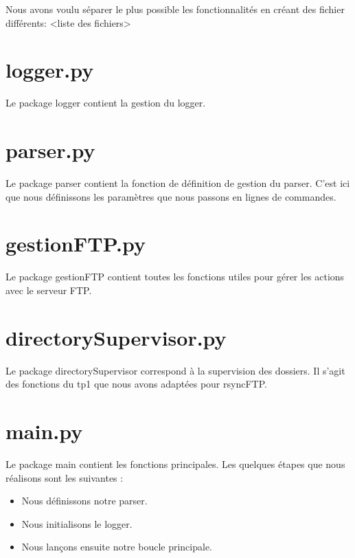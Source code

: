 Nous avons voulu séparer le plus possible les fonctionnalités en créant des fichier différents: <liste des fichiers>

\section{logger.py}	

Le package logger contient la gestion du logger.

\section{parser.py}

Le package parser contient la fonction de définition de gestion du parser. C'est ici que nous définissons les paramètres que nous passons en lignes de commandes.

\section{gestionFTP.py}

Le package gestionFTP contient toutes les fonctions utiles pour gérer les actions avec le serveur FTP.

\section{directorySupervisor.py}

Le package directorySupervisor correspond à la supervision des dossiers. Il s'agit des fonctions du tp1 que nous avons adaptées pour rsyncFTP.

\section{main.py}

Le package main contient les fonctions principales. Les quelques étapes que nous réalisons sont les suivantes :
\begin{itemize}
\item Nous définissons notre parser.
\item Nous initialisons le logger.
\item Nous lançons ensuite notre boucle principale.
\end{itemize}
